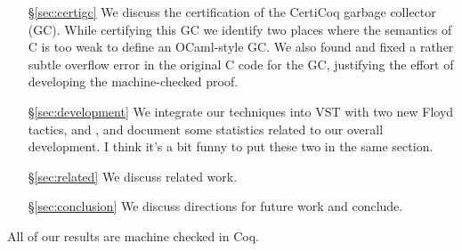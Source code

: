 \begin{itemize}
\item[\S\ref{sec:certigc}] We discuss the certification of the CertiCoq garbage collector (GC). While certifying this GC we identify two places where the semantics of C is too weak to define an OCaml-style GC. We also found and fixed a rather subtle overflow error in the original C code for the GC, justifying the effort of developing the machine-checked proof.
\item[\S\ref{sec:development}] We integrate our techniques into VST with two new Floyd 
tactics,  and , and document some statistics related to our 
overall development. {\color{blue} I think it's a bit funny to put these two in the same 
section.}
\item[\S\ref{sec:related}] We discuss related work.
\item[\S\ref{sec:conclusion}] We discuss directions for future work and conclude.
\end{itemize}
All of our results are machine checked in Coq.
